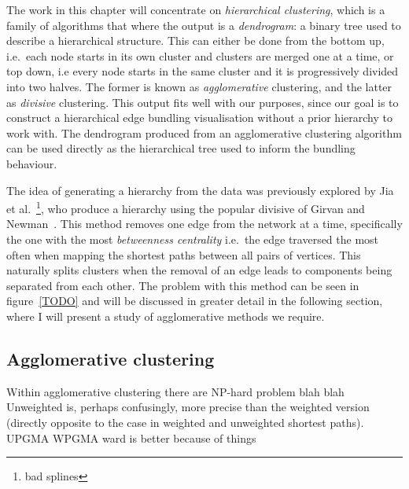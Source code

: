 The work in this chapter will concentrate on \textit{hierarchical clustering}, which is a family of algorithms that where the output is a 
\textit{dendrogram}: a binary tree used to describe a hierarchical structure. This can either be done from the bottom up, i.e.\ each node starts in its own cluster and clusters are merged one at a time, or top down, i.e every node starts in the same cluster and it is progressively divided into two halves. The former is known as \emph{agglomerative} clustering, and the latter as \emph{divisive} clustering.
This output fits well with our purposes, since our goal is to construct a hierarchical edge bundling visualisation without a prior hierarchy to work with. The dendrogram produced from an agglomerative clustering algorithm can be used directly as the hierarchical tree used to inform the bundling behaviour.


The idea of generating a hierarchy from the data was previously explored by Jia et al.~\cite{TODO}\footnote{bad splines}, who produce a hierarchy using the popular divisive of Girvan and Newman~\cite{TODO}. This method removes one edge from the network at a time, specifically the one with the most \emph{betweenness centrality} i.e.\ the edge traversed the most often when mapping the shortest paths between all pairs of vertices. This naturally splits clusters when the removal of an edge leads to components being separated from each other. The problem with this method can be seen in figure~\ref{TODO} and will be discussed in greater detail in the following section, where I will present a study of agglomerative methods we require. 


\subsection{Agglomerative clustering}
Within agglomerative clustering there are 
NP-hard problem blah blah
Unweighted is, perhaps confusingly, more precise than the weighted version (directly opposite to the case in weighted and unweighted shortest paths). 
UPGMA WPGMA ward is better because of things


